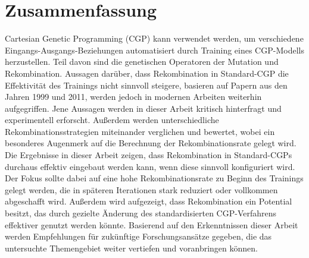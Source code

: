 \section*{Zusammenfassung}

Cartesian Genetic Programming (CGP) kann verwendet werden, um verschiedene Eingangs-Ausgangs-Beziehungen automatisiert durch Training eines CGP-Modells herzustellen.
Teil davon sind die genetischen Operatoren der Mutation und Rekombination.
Aussagen darüber, dass Rekombination in Standard-CGP die Effektivität des Trainings nicht sinnvoll steigere, basieren auf Papern aus den Jahren 1999 und 2011, werden jedoch in modernen Arbeiten weiterhin aufgegriffen.
Jene Aussagen werden in dieser Arbeit kritisch hinterfragt und experimentell erforscht.
Außerdem werden unterschiedliche Rekombinationsstrategien miteinander verglichen und bewertet, wobei ein besonderes Augenmerk auf die Berechnung der Rekombinationsrate gelegt wird.
Die Ergebnisse in dieser Arbeit zeigen, dass Rekombination in Standard-CGPs durchaus effektiv eingebaut werden kann, wenn diese sinnvoll konfiguriert wird.
Der Fokus sollte dabei auf eine hohe Rekombinationsrate zu Beginn des Trainings gelegt werden, die in späteren Iterationen stark reduziert oder vollkommen abgeschafft wird.
Außerdem wird aufgezeigt, dass Rekombination ein Potential besitzt, das durch gezielte Änderung des standardisierten CGP-Verfahrens effektiver genutzt werden könnte.
Basierend auf den Erkenntnissen dieser Arbeit werden Empfehlungen für zukünftige Forschungsansätze gegeben, die das untersuchte Themengebiet weiter vertiefen und voranbringen können.
